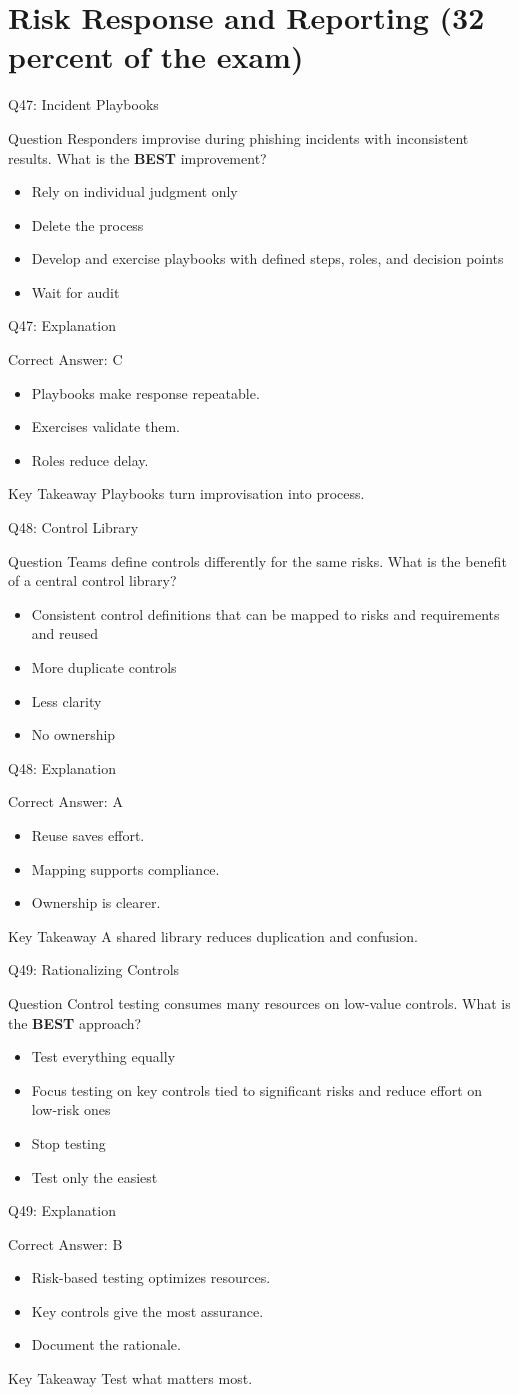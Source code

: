 \documentclass[aspectratio=169]{beamer}
\newcommand{\hq}[7]{%
	\begin{frame}{Q#1: #2}
		\begin{block}{Question}
			#3
		\end{block}
		\begin{itemize}
			#4
		\end{itemize}
	\end{frame}
	\begin{frame}{Q#1: Explanation}
		\begin{block}{Correct Answer: #5}
			\begin{itemize}
				#6
			\end{itemize}
		\end{block}
		\begin{alertblock}{Key Takeaway}
			#7
		\end{alertblock}
	\end{frame}
}
\begin{document}
	\section{Risk Response and Reporting (32 percent of the exam)}

	\hq{47}{Incident Playbooks}
	{Responders improvise during phishing incidents with inconsistent results. What is the \textbf{BEST} improvement?}
	{\item[\textbf{(A)}] Rely on individual judgment only
		\item[\textbf{(B)}] Delete the process
		\item[\textbf{(C)}] Develop and exercise playbooks with defined steps, roles, and decision points
		\item[\textbf{(D)}] Wait for audit}
	{C}
	{\item Playbooks make response repeatable.
		\item Exercises validate them.
		\item Roles reduce delay.}
	{Playbooks turn improvisation into process.}

	\hq{48}{Control Library}
	{Teams define controls differently for the same risks. What is the benefit of a central control library?}
	{\item[\textbf{(A)}] Consistent control definitions that can be mapped to risks and requirements and reused
		\item[\textbf{(B)}] More duplicate controls
		\item[\textbf{(C)}] Less clarity
		\item[\textbf{(D)}] No ownership}
	{A}
	{\item Reuse saves effort.
		\item Mapping supports compliance.
		\item Ownership is clearer.}
	{A shared library reduces duplication and confusion.}

	\hq{49}{Rationalizing Controls}
	{Control testing consumes many resources on low-value controls. What is the \textbf{BEST} approach?}
	{\item[\textbf{(A)}] Test everything equally
		\item[\textbf{(B)}] Focus testing on key controls tied to significant risks and reduce effort on low-risk ones
		\item[\textbf{(C)}] Stop testing
		\item[\textbf{(D)}] Test only the easiest}
	{B}
	{\item Risk-based testing optimizes resources.
		\item Key controls give the most assurance.
		\item Document the rationale.}
	{Test what matters most.}
\end{document}
